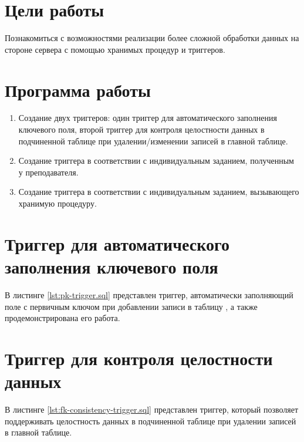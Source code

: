





\tableofcontents
\newpage

\section{Цели работы}

Познакомиться с возможностями реализации более сложной обработки данных на стороне сервера с помощью хранимых процедур и триггеров.

\section{Программа работы}

\begin{enumerate}
	\item Создание двух триггеров: один триггер для автоматического заполнения ключевого поля, второй триггер для контроля целостности данных в подчиненной таблице при удалении/изменении записей в главной таблице.
	\item Создание триггера в соответствии с индивидуальным заданием, полученным у преподавателя.
	\item Создание триггера в соответствии с индивидуальным заданием, вызывающего хранимую процедуру.
\end{enumerate}
 
\section{Триггер для автоматического заполнения ключевого поля}

В листинге \ref{lst:pk-trigger.sql} представлен триггер, автоматически заполняющий поле с первичным ключом при добавлении записи в таблицу , а также продемонстрирована его работа.



 
\section{Триггер для контроля целостности данных}

В листинге \ref{lst:fk-consistency-trigger.sql} представлен триггер, который позволяет поддерживать целостность данных в подчиненной таблице при удалении записей в главной таблице.

